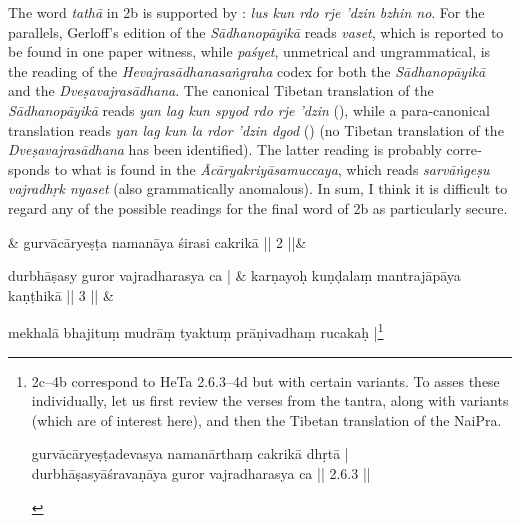 \documentclass[naipra.tex]{subfiles}
\begin{document}
\begin{sanskrit}
{\begin{english}
		The word \emph{tathā} in 2b is supported by \TIB : \emph{lus kun rdo rje 'dzin bzhin no}.
		For the parallels, Gerloff's edition of the \emph{Sādhanopāyikā} reads \emph{vaset}, which is reported to be found in one paper witness, while \emph{paśyet}, unmetrical and ungrammatical, is the reading of the \emph{Hevajrasādhanasaṅgraha} codex for both the \emph{Sādhanopāyikā} and the \emph{Dveṣavajrasādhana}.
		The canonical Tibetan translation of the \emph{Sādhanopāyikā} reads \emph{yan lag kun spyod rdo rje 'dzin} (\cite[vol.\ 1 135]{gerloff2020}), while a para-canonical translation reads \emph{yan lag kun la rdor 'dzin dgod} (\cite[vol.\ 2 152]{gerloff2020}) (no Tibetan translation of the \emph{Dveṣavajrasādhana} has been identified).
		The latter reading is probably corresponds to what is found in the \emph{Ācāryakriyāsamuccaya}, which reads \emph{sarvāṅgeṣu vajradhṛk nyaset} (also grammatically anomalous).
		In sum, I think it is difficult to regard any of the possible readings for the final word of 2b as particularly secure.
	\label{2bnote}
\end{english}} & 
gurvācāryeṣṭa namanāya śirasi cakrikā || 2 ||\&


\medskip\versequote
durbhāṣasy guror vajradharasya ca | &
karṇayoḥ kuṇḍalaṃ  mantrajāpāya kaṇṭhikā || 3 || \& 


\medskip\versequote 
mekhalā bhajituṃ mudrāṃ tyaktuṃ prāṇivadhaṃ rucakaḥ |\footnote{
	\begin{english}%
		2c–4b correspond to HeTa 2.6.3–4d but with certain variants.
		To asses these individually, let us first review the verses from the tantra, along with variants (which are of interest here), and then the Tibetan translation of the NaiPra.

		\begin{prosequote}%
			gurvācāryeṣṭadevasya namanārthaṃ cakrikā dhṛtā |\\
			durbhāṣasyāśravaṇāya guror vajradharasya ca || 2.6.3 ||
			\medskip	


\end{prosequote}
\end{english}}
\end{sanskrit}
\end{document}
